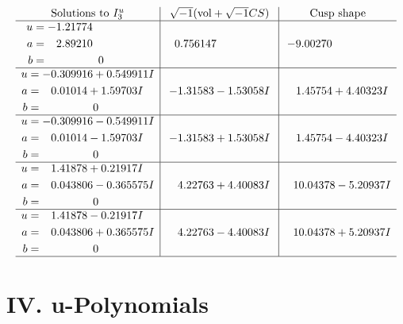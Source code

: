 \documentclass[1p]{elsarticle_modified}
\theoremstyle{definition}
\newcommand{\I}{\sqrt{-1}}
\begin{document}
$$\begin{array}{c|c|c}  
\text{Solutions to }I^u_{3}& \I (\text{vol} + \sqrt{-1}CS) & \text{Cusp shape}\\
 \hline 
\begin{aligned}
u &= -1.21774\phantom{ +0.000000I} \\
a &= \phantom{-}2.89210\phantom{ +0.000000I} \\
b &= \phantom{-0.000000 } 0\end{aligned}
 & \phantom{-}0.756147\phantom{ +0.000000I} & -9.00270\phantom{ +0.000000I} \\ \hline\begin{aligned}
u &= -0.309916 + 0.549911 I \\
a &= \phantom{-}0.01014 + 1.59703 I \\
b &= \phantom{-0.000000 } 0\end{aligned}
 & -1.31583 - 1.53058 I & \phantom{-}1.45754 + 4.40323 I \\ \hline\begin{aligned}
u &= -0.309916 - 0.549911 I \\
a &= \phantom{-}0.01014 - 1.59703 I \\
b &= \phantom{-0.000000 } 0\end{aligned}
 & -1.31583 + 1.53058 I & \phantom{-}1.45754 - 4.40323 I \\ \hline\begin{aligned}
u &= \phantom{-}1.41878 + 0.21917 I \\
a &= \phantom{-}0.043806 - 0.365575 I \\
b &= \phantom{-0.000000 } 0\end{aligned}
 & \phantom{-}4.22763 + 4.40083 I & \phantom{-}10.04378 - 5.20937 I \\ \hline\begin{aligned}
u &= \phantom{-}1.41878 - 0.21917 I \\
a &= \phantom{-}0.043806 + 0.365575 I \\
b &= \phantom{-0.000000 } 0\end{aligned}
 & \phantom{-}4.22763 - 4.40083 I & \phantom{-}10.04378 + 5.20937 I\\
 \hline 
 \end{array}$$\newpage
\newpage\renewcommand{\arraystretch}{1}
\centering \section*{ IV. u-Polynomials}
\end{document}
